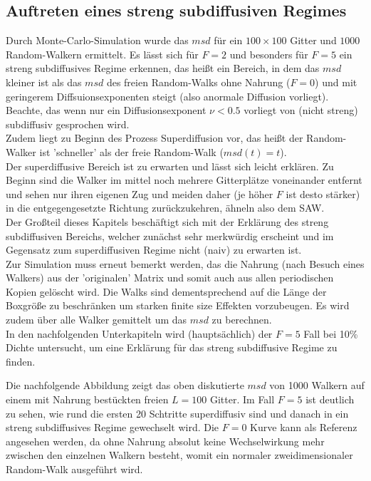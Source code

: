 \documentclass[a4paper, 12pt]{scrartcl}
\begin{document}
\subsection{Auftreten eines streng subdiffusiven Regimes}
Durch Monte-Carlo-Simulation wurde das $msd$ für ein $100 \times 100$ Gitter und $1000$ Random-Walkern ermittelt. Es lässt sich für $F=2$ und besonders für $F=5$ ein streng subdiffusives Regime erkennen, das heißt ein Bereich, in dem das $msd$ kleiner ist als das $msd$ des freien Random-Walks ohne Nahrung ($F=0$) und mit geringerem Diffsuionsexponenten steigt (also anormale Diffusion vorliegt). Beachte, das wenn nur ein Diffusionsexponent $\nu < 0.5$ vorliegt von (nicht streng) subdiffusiv gesprochen wird.\\
\noindent Zudem liegt zu Beginn des Prozess Superdiffusion vor, das heißt der Random-Walker ist 'schneller' als der freie Random-Walk ($msd(t)=t$).\\
\noindent Der superdiffusive Bereich ist zu erwarten und lässt sich leicht erklären. Zu Beginn sind die Walker im mittel noch mehrere Gitterplätze voneinander entfernt und sehen nur ihren eigenen Zug und meiden daher (je höher $F$ ist desto stärker) in die entgegengesetzte Richtung zurückzukehren, ähneln also dem SAW. \\
\noindent Der Großteil dieses Kapitels beschäftigt sich mit der Erklärung des streng subdiffusiven Bereichs, welcher zunächst sehr merkwürdig erscheint und im Gegensatz zum superdiffusiven Regime nicht (naiv) zu erwarten ist.
\\
\noindent Zur Simulation muss erneut bemerkt werden, das die Nahrung (nach Besuch eines Walkers) aus der 'originalen' Matrix und somit auch aus allen periodischen Kopien gelöscht wird. Die Walks sind dementsprechend auf die Länge der Boxgröße zu beschränken um starken finite size Effekten vorzubeugen. Es wird zudem über alle Walker gemittelt um das $msd$ zu berechnen.
\\
\noindent In den nachfolgenden Unterkapiteln wird (hauptsächlich) der $F=5$ Fall bei 10\% Dichte untersucht, um eine Erklärung für das streng subdiffusive Regime zu finden. 

\noindent Die nachfolgende Abbildung zeigt das oben diskutierte $msd$ von 1000 Walkern auf einem mit Nahrung bestückten freien $L=100$ Gitter. Im Fall $F=5$ ist deutlich zu sehen, wie rund die ersten 20 Schtritte superdiffusiv sind und danach in ein streng subdiffusives Regime gewechselt wird. Die $F=0$ Kurve kann als Referenz angesehen werden, da ohne Nahrung absolut keine Wechselwirkung mehr zwischen den einzelnen Walkern besteht, womit ein normaler zweidimensionaler Random-Walk ausgeführt wird.
\end{document}
